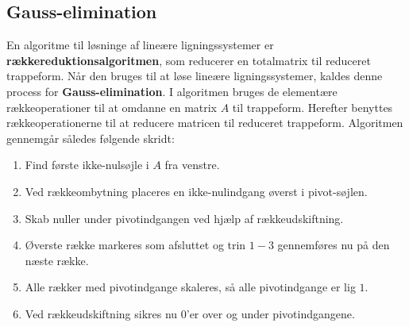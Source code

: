 \subsection{Gauss-elimination}
\label{gauss}
En algoritme til løsninge af lineære ligningssystemer er  \textbf{rækkereduktionsalgoritmen}, som reducerer en totalmatrix til reduceret trappeform.
Når den bruges til at løse lineære ligningssystemer, kaldes denne process for \textbf{Gauss-elimination}.
I algoritmen bruges de elementære rækkeoperationer til at omdanne en matrix $A$ til trappeform. 
Herefter benyttes rækkeoperationerne til at reducere matricen til reduceret trappeform.
Algoritmen gennemgår således følgende skridt:
%
\begin{enumerate}
\item Find første ikke-nulsøjle i $A$ fra venstre.
\item Ved rækkeombytning placeres en ikke-nulindgang øverst i pivot-søjlen.
\item Skab nuller under pivotindgangen ved hjælp af rækkeudskiftning.
\item Øverste række markeres som afsluttet og trin $1-3$ gennemføres nu på den næste række.
\item Alle rækker med pivotindgange skaleres, så alle pivotindgange er lig $1$.
\item Ved rækkeudskiftning sikres nu $0$'er over og under pivotindgangene.
\end{enumerate}
%
